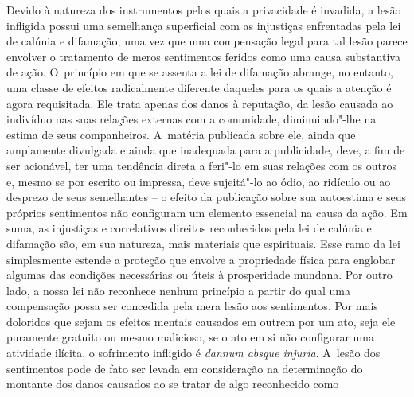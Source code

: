 Devido à natureza dos instrumentos pelos quais a privacidade é invadida,
a lesão infligida possui uma semelhança superficial com as injustiças
enfrentadas pela lei de calúnia e difamação, uma vez que uma compensação
legal para tal lesão parece envolver o tratamento de meros sentimentos
feridos como uma causa substantiva de ação. O~princípio em que se
assenta a lei de difamação abrange, no entanto, uma classe de efeitos
radicalmente diferente daqueles para os quais a atenção é agora
requisitada. Ele trata apenas dos danos à reputação, da lesão causada ao
indivíduo nas suas relações externas com a comunidade, diminuindo"-lhe na
estima de seus companheiros. A~matéria publicada sobre ele, ainda que
amplamente divulgada e ainda que inadequada para a publicidade, deve, a
fim de ser acionável, ter uma tendência direta a feri"-lo em suas
relações com os outros e, mesmo se por escrito ou impressa, deve
sujeitá"-lo ao ódio, ao ridículo ou ao desprezo de seus semelhantes -- o
efeito da publicação sobre sua autoestima e seus próprios sentimentos
não configuram um elemento essencial na causa da ação. Em suma, as
injustiças e correlativos direitos reconhecidos pela lei de calúnia e
difamação são, em sua natureza, mais materiais que espirituais. Esse
ramo da lei simplesmente estende a proteção que envolve a propriedade
física para englobar algumas das condições necessárias ou úteis à
prosperidade mundana. Por outro lado, a nossa lei não reconhece nenhum
princípio a partir do qual uma compensação possa ser concedida pela mera
lesão aos sentimentos. Por mais doloridos que sejam os efeitos mentais
causados em outrem por um ato, seja ele puramente gratuito ou mesmo
malicioso, se o ato em si não configurar uma atividade ilícita, o
sofrimento infligido é \emph{dannum absque injuria}. A~lesão dos
sentimentos pode de fato ser levada em consideração na determinação do
montante dos danos causados ao se tratar de algo reconhecido como
